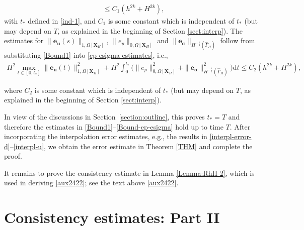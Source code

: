 \documentclass[11pt,reqno]{amsart}
\theoremstyle{definition}
\theoremstyle{plain}
\numberwithin{theorem}{section}
\numberwithin{proposition}{section}
\numberwithin{lemma}{section}
\numberwithin{equation}{section}
\newcommand{\bs}[1]{\boldsymbol{#1}}
\def\d{\mathrm{d}}
\renewcommand{\(}{\bigl(}
\renewcommand{\)}{\bigr)}
\begin{document}
\begin{itemize}[leftmargin=20pt]
\begin{align}
&\le C_1(h^{2k}+H^{2k}), 
\end{align}
with $t_*$ defined in \eqref{ind-1}, and $C_1$ is some constant which is independent of $t_*$ (but may depend on $T$, as explained in the beginning of Section \ref{sect:interp}). The estimates for $\|{\bs e}_{\bs u}(s)\|_{1,\Omega[{\bs X}_H]}$, $\| e_p \|_{0,\Omega[{\bs X}_H]}$ and $\| {\bs e}_{{\bs \sigma} } \|_{H^{-\frac12}(\widehat\Gamma_H)}$ follow from substituting \eqref{Bound1} into \eqref{ep-esigma-estimates}, i.e., 
\begin{align}\label{Bound-ep-esigma}
H^2\max_{t\in[0,t_*]}\|{\bs e}_{\bs u}(t)\|_{1,\Omega[{\bs X}_H]}^2
+H^2\int_0^{t_*} \big( \| e_p \|_{0,\Omega[{\bs X}_H]}^2 
+  \| {\bs e}_{{\bs \sigma} } \|_{H^{-\frac12}(\widehat\Gamma_H)}^2 \big) \d t 
\le C_2(h^{2k}+H^{2k}) ,
\end{align}
\end{itemize}
where $C_2$ is some constant which is independent of $t_*$ (but may depend on $T$, as explained in the beginning of Section \ref{sect:interp}).

In view of the discussions in Section~\ref{section:outline}, this proves $t_*=T$ and therefore the estimates in \eqref{Bound1}--\eqref{Bound-ep-esigma} hold up to time $T$. After incorporating the interpolation error estimates, e.g., the results in \eqref{interpl-error-d}--\eqref{interpl-u}, we obtain the error estimate in Theorem \ref{THM} and complete the proof. 

It remains to prove the consistency estimate in Lemma \ref{Lemma:RhH-2}, which is used in deriving \eqref{aux2422}; see the text above \eqref{aux2422}.


\section{Consistency estimates: Part II}\label{section:consistency-2}
\end{document}
